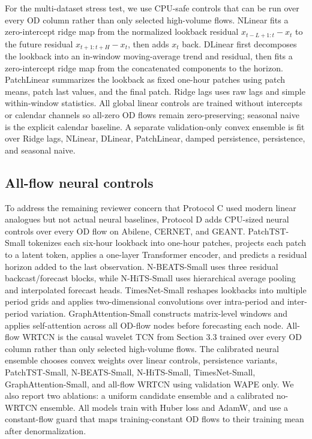 \documentclass{article}
\begin{document}
For the multi-dataset stress test, we use CPU-safe controls that can be run over every OD column rather than only selected high-volume flows. NLinear fits a zero-intercept ridge map from the normalized lookback residual $x_{t-L+1:t}-x_t$ to the future residual $x_{t+1:t+H}-x_t$, then adds $x_t$ back. DLinear first decomposes the lookback into an in-window moving-average trend and residual, then fits a zero-intercept ridge map from the concatenated components to the horizon. PatchLinear summarizes the lookback as fixed one-hour patches using patch means, patch last values, and the final patch. Ridge lags uses raw lags and simple within-window statistics. All global linear controls are trained without intercepts or calendar channels so all-zero OD flows remain zero-preserving; seasonal naive is the explicit calendar baseline. A separate validation-only convex ensemble is fit over Ridge lags, NLinear, DLinear, PatchLinear, damped persistence, persistence, and seasonal naive.

\subsection{All-flow neural controls}

To address the remaining reviewer concern that Protocol C used modern linear analogues but not actual neural baselines, Protocol D adds CPU-sized neural controls over every OD flow on Abilene, CERNET, and GEANT. PatchTST-Small tokenizes each six-hour lookback into one-hour patches, projects each patch to a latent token, applies a one-layer Transformer encoder, and predicts a residual horizon added to the last observation. N-BEATS-Small uses three residual backcast/forecast blocks, while N-HiTS-Small uses hierarchical average pooling and interpolated forecast heads. TimesNet-Small reshapes lookbacks into multiple period grids and applies two-dimensional convolutions over intra-period and inter-period variation. GraphAttention-Small constructs matrix-level windows and applies self-attention across all OD-flow nodes before forecasting each node. All-flow WRTCN is the causal wavelet TCN from Section 3.3 trained over every OD column rather than only selected high-volume flows. The calibrated neural ensemble chooses convex weights over linear controls, persistence variants, PatchTST-Small, N-BEATS-Small, N-HiTS-Small, TimesNet-Small, GraphAttention-Small, and all-flow WRTCN using validation WAPE only. We also report two ablations: a uniform candidate ensemble and a calibrated no-WRTCN ensemble. All models train with Huber loss and AdamW, and use a constant-flow guard that maps training-constant OD flows to their training mean after denormalization.
\end{document}
